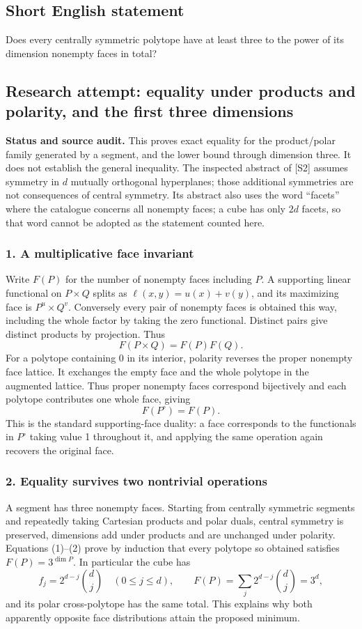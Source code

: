 \documentclass[11pt,a4paper]{article}
\begin{document}
\subsection{Short English statement}

Does every centrally symmetric polytope have at least three to the power of its dimension nonempty faces in total?

\subsection{Research attempt: equality under products and polarity, and the first three dimensions}
\textbf{Status and source audit.} This proves exact equality for the product/polar family generated by a segment, and the lower bound through dimension three. It does not establish the general inequality. The inspected abstract of [S2] assumes symmetry in $d$ mutually orthogonal hyperplanes; those additional symmetries are not consequences of central symmetry. Its abstract also uses the word ``facets'' where the catalogue concerns all nonempty faces; a cube has only $2d$ facets, so that word cannot be adopted as the statement counted here.

\subsubsection{1. A multiplicative face invariant}
Write $F(P)$ for the number of nonempty faces including $P$. A supporting linear functional on $P\times Q$ splits as $\ell(x,y)=u(x)+v(y)$, and its maximizing face is $P^u\times Q^v$. Conversely every pair of nonempty faces is obtained this way, including the whole factor by taking the zero functional. Distinct pairs give distinct products by projection. Thus
\[F(P\times Q)=F(P)F(Q).\tag{1}\]
For a polytope containing 0 in its interior, polarity reverses the proper nonempty face lattice. It exchanges the empty face and the whole polytope in the augmented lattice. Thus proper nonempty faces correspond bijectively and each polytope contributes one whole face, giving
\[F(P^\circ)=F(P).\tag{2}\]
This is the standard supporting-face duality: a face corresponds to the functionals in $P^\circ$ taking value 1 throughout it, and applying the same operation again recovers the original face.

\subsubsection{2. Equality survives two nontrivial operations}
A segment has three nonempty faces. Starting from centrally symmetric segments and repeatedly taking Cartesian products and polar duals, central symmetry is preserved, dimensions add under products and are unchanged under polarity. Equations (1)--(2) prove by induction that every polytope so obtained satisfies $F(P)=3^{\dim P}$. In particular the cube has
\[f_j=2^{d-j}\binom dj\quad(0\leq j\leq d),\qquad
F(P)=\sum_j2^{d-j}\binom dj=3^d,\]
and its polar cross-polytope has the same total. This explains why both apparently opposite face distributions attain the proposed minimum.
\end{document}
